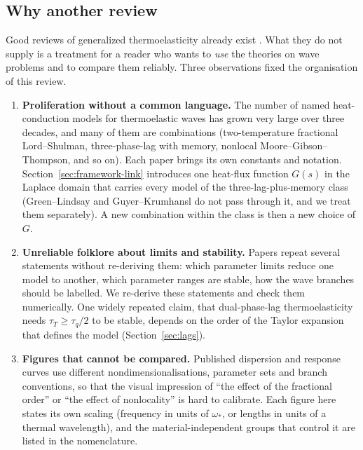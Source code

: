 \subsection{Why another review}
Good reviews of generalized thermoelasticity already exist \citep{Chandrasekharaiah1986,Chandrasekharaiah1998,HetnarskiIgnaczak1999,HetnarskiIgnaczak2000,Shakeriaski2021,Huang2025}. What they do not supply is a treatment for a reader who wants to \emph{use} the theories on wave problems and to compare them reliably. Three observations fixed the organisation of this review.
\begin{enumerate}
\item \textbf{Proliferation without a common language.} The number of named heat-conduction models for thermoelastic waves has grown very large over three decades, and many of them are combinations (two-temperature fractional Lord--Shulman, three-phase-lag with memory, nonlocal Moore--Gibson--Thompson, and so on). Each paper brings its own constants and notation. Section~\ref{sec:framework-link} introduces one heat-flux function $G(s)$ in the Laplace domain that carries every model of the three-lag-plus-memory class (Green--Lindsay and Guyer--Krumhansl do not pass through it, and we treat them separately). A new combination within the class is then a new choice of $G$.
\item \textbf{Unreliable folklore about limits and stability.} Papers repeat several statements without re-deriving them: which parameter limits reduce one model to another, which parameter ranges are stable, how the wave branches should be labelled. We re-derive these statements and check them numerically. One widely repeated claim, that dual-phase-lag thermoelasticity needs $\tau_T\ge\tau_q/2$ to be stable, depends on the order of the Taylor expansion that defines the model (Section~\ref{sec:lags}).
\item \textbf{Figures that cannot be compared.} Published dispersion and response curves use different nondimensionalisations, parameter sets and branch conventions, so that the visual impression of ``the effect of the fractional order'' or ``the effect of nonlocality'' is hard to calibrate. Each figure here states its own scaling (frequency in units of $\omega_*$, or lengths in units of a thermal wavelength), and the material-independent groups that control it are listed in the nomenclature.
\end{enumerate}

